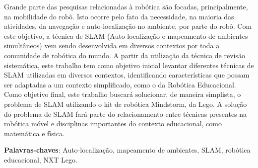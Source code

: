 \begin{resumo}
 
 	Grande parte das pesquisas relacionadas à robótica são focadas, principalmente, na mobilidade do robô. Isto ocorre pelo fato da necessidade, na maioria das atividades, da navegação e auto-localização no ambiente, por parte do robô. Com este objetivo, a técnica de SLAM (Auto-localização e mapeamento de ambientes simultâneos) vem sendo desenvolvida em diversos contextos por toda a comunidade de robótica do mundo. A partir da utilização da técnica de revisão sistemática, este trabalho tem como objetivo inicial levantar diferentes técnicas de SLAM utilizadas em diversos contextos, identificando características que possam ser adaptadas a um contexto simplificado, como o da Robótica Educacional. Como objetivo final, este trabalho buscará solucionar, de maneira simplista, o problema de SLAM utilizando o kit de robótica Mindstorm, da Lego. A solução do problema de SLAM fará parte do relacionamento entre técnicas presentes na robótica móvel e disciplinas importantes do contexto educacional, como matemática e física. 

 \vspace{\onelineskip}
    
 \noindent
 \textbf{Palavras-chaves}: Auto-localização, mapeamento de ambientes, SLAM, robótica educacional, NXT Lego.
\end{resumo}
